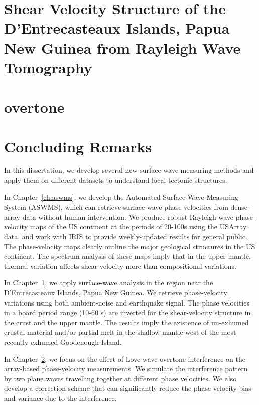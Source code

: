 \documentclass[12pt,oneside]{book}
\begin{document}
\singlespacing
\chapter[Shear velocity structure of the DI, PNG]{Shear Velocity Structure of the D'Entrecasteaux Islands, Papua New Guinea from Rayleigh Wave Tomography}
\label{ch:png}
\doublespacing

\singlespacing
\chapter[Overtone]{overtone}
\label{ch:overtone}
\doublespacing

\singlespacing
\chapter[Conclusion]{Concluding Remarks}
\label{ch:conclusion}
\doublespacing

In this dissertation, we develop several new surface-wave measuring methods and apply them on different datasets to understand local tectonic structures.

In Chapter~\ref{ch:aswms}, we develop the Automated Surface-Wave Measuring System (ASWMS), which can retrieve surface-wave phase velocities from dense-array data without human intervention. We produce robust Rayleigh-wave phase-velocity maps of the US continent at the periods of 20-100s using the USArray data, and work with IRIS to provide weekly-updated results for general public. The phase-velocity maps clearly outline the major geological structures in the US continent. The spectrum analysis of these maps imply that in the upper mantle, thermal variation affects shear velocity more than compositional variations.

In Chapter~\ref{ch:png}, we apply surface-wave analysis in the region near the D'Entrecasteaux Islands, Papua New Guinea. We retrieve phase-velocity variations using both ambient-noise and earthquake signal. The phase velocities in a board period range (10-60 s) are inverted for the shear-velocity structure in the crust and the upper mantle. The results imply the existence of un-exhumed crustal material and/or partial melt in the shallow mantle west of the most recently exhumed Goodenough Island.

In Chapter~\ref{ch:overtone}, we focus on the effect of Love-wave overtone interference on the array-based phase-velocity measurements. We simulate the interference pattern by two plane waves travelling together at different phase velocities. We also develop a correction scheme that can significantly reduce the phase-velocity bias and variance due to the interference. 

\cleardoublepage
\normalsize
\singlespacing


\clearpage
\end{document}
